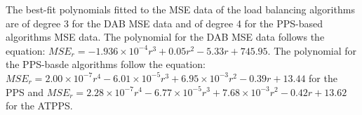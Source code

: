 The best-fit polynomials fitted to the MSE data of the load balancing algorithms are of degree 3 for the DAB MSE data and of degree 4 for the PPS-based algorithms MSE data. The polynomial for the DAB MSE data follows the equation: $MSE_r=-1.936\times 10^{-4}r^{3}+0.05r^{2}-5.33r+745.95$. The polynomial for the PPS-basde algorithms follow the equation: $MSE_r=2.00\times 10^{-7}r^{4}-6.01\times 10^{-5}r^{3}+6.95\times 10^{-3}r^{2}-0.39r+13.44$ for the PPS and $MSE_r=2.28\times 10^{-7}r^{4}-6.77\times 10^{-5}r^{3}+7.68\times 10^{-3}r^{2}-0.42r+13.62$ for the ATPPS. 
%
%
%
%
